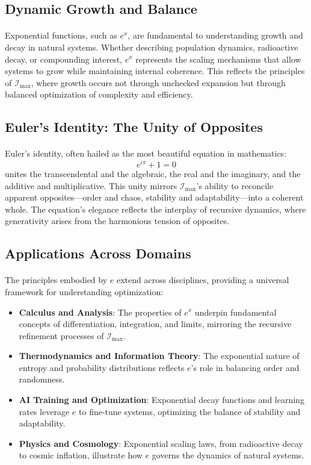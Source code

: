 \documentclass[12pt]{article}
\begin{document}
\subsection{Dynamic Growth and Balance}
\paragraph{}
Exponential functions, such as \(e^x\), are fundamental to understanding growth and decay in natural systems. Whether describing population dynamics, radioactive decay, or compounding interest, \(e^x\) represents the scaling mechanisms that allow systems to grow while maintaining internal coherence. This reflects the principles of \(\mathcal{I}_{\text{max}}\), where growth occurs not through unchecked expansion but through balanced optimization of complexity and efficiency.

\subsection{Euler’s Identity: The Unity of Opposites}
\paragraph{}
Euler’s identity, often hailed as the most beautiful equation in mathematics:
\[
e^{i\pi} + 1 = 0
\]
unites the transcendental and the algebraic, the real and the imaginary, and the additive and multiplicative. This unity mirrors \(\mathcal{I}_{\text{max}}\)’s ability to reconcile apparent opposites—order and chaos, stability and adaptability—into a coherent whole. The equation’s elegance reflects the interplay of recursive dynamics, where generativity arises from the harmonious tension of opposites.

\subsection{Applications Across Domains}
\paragraph{}
The principles embodied by \(e\) extend across disciplines, providing a universal framework for understanding optimization:
\begin{itemize}
    \item \textbf{Calculus and Analysis}: The properties of \(e^x\) underpin fundamental concepts of differentiation, integration, and limits, mirroring the recursive refinement processes of \(\mathcal{I}_{\text{max}}\).
    \item \textbf{Thermodynamics and Information Theory}: The exponential nature of entropy and probability distributions reflects \(e\)’s role in balancing order and randomness.
    \item \textbf{AI Training and Optimization}: Exponential decay functions and learning rates leverage \(e\) to fine-tune systems, optimizing the balance of stability and adaptability.
    \item \textbf{Physics and Cosmology}: Exponential scaling laws, from radioactive decay to cosmic inflation, illustrate how \(e\) governs the dynamics of natural systems.
\end{itemize}
\end{document}
